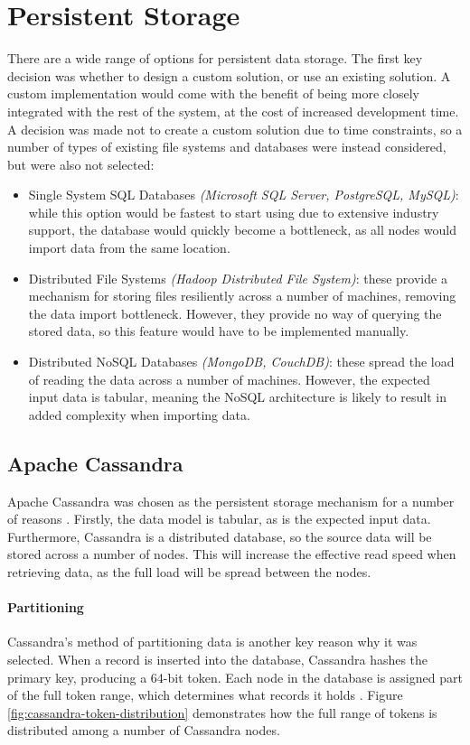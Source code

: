 \section{Persistent Storage}
There are a wide range of options for persistent data storage. The first key decision was whether to design a custom solution, or use an existing solution. A custom implementation would come with the benefit of being more closely integrated with the rest of the system, at the cost of increased development time. A decision was made not to create a custom solution due to time constraints, so a number of types of existing file systems and databases were instead considered, but were also not selected:
\begin{itemize}
	\item Single System SQL Databases \textit{(Microsoft SQL Server, PostgreSQL, MySQL)}: while this option would be fastest to start using due to extensive industry support, the database would quickly become a bottleneck, as all nodes would import data from the same location.
	\item Distributed File Systems \textit{(Hadoop Distributed File System)}: these provide a mechanism for storing files resiliently across a number of machines, removing the data import bottleneck. However, they provide no way of querying the stored data, so this feature would have to be implemented manually.
	\item Distributed NoSQL Databases \textit{(MongoDB, CouchDB)}: these spread the load of reading the data across a number of machines. However, the expected input data is tabular, meaning the NoSQL architecture is likely to result in added complexity when importing data.
\end{itemize}

\subsection{Apache Cassandra}\label{subsec:cassandra-design}
Apache Cassandra was chosen as the persistent storage mechanism for a number of reasons \cite{lakshman2010cassandra}. Firstly, the data model is tabular, as is the expected input data. Furthermore, Cassandra is a distributed database, so the source data will be stored across a number of nodes. This will increase the effective read speed when retrieving data, as the full load will be spread between the nodes.

\paragraph{Partitioning}
Cassandra's method of partitioning data is another key reason why it was selected. When a record is inserted into the database, Cassandra hashes the primary key, producing a 64-bit token. Each node in the database is assigned part of the full token range, which determines what records it holds \cite{lakshman2010cassandra}. Figure \ref{fig:cassandra-token-distribution} demonstrates how the full range of tokens is distributed among a number of Cassandra nodes.

